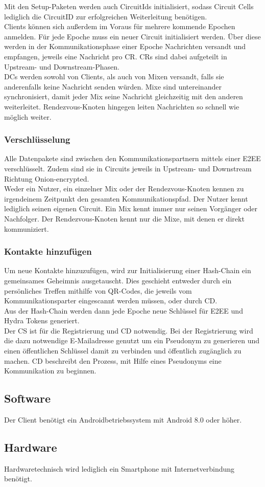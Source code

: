 Mit den Setup-Paketen werden auch CircuitIds initialisiert, sodass Circuit Cells lediglich die CircuitID zur erfolgreichen Weiterleitung benötigen.\\
Clients können sich außerdem im Voraus für mehrere kommende Epochen anmelden.
Für jede Epoche muss ein neuer Circuit initialisiert werden.
Über diese werden in der Kommunikationsphase einer Epoche Nachrichten versandt und empfangen, jeweils eine Nachricht pro \ac{CR}.
\acp{CR} sind dabei aufgeteilt in Upstream- und Downstream-Phasen.\\
\acp{DC} werden sowohl von Clients, als auch von Mixen versandt, falls sie anderenfalls keine Nachricht senden würden.
Mixe sind untereinander synchronisiert, damit jeder Mix seine Nachricht gleichzeitig mit den anderen weiterleitet.
Rendezvous-Knoten hingegen leiten Nachrichten so schnell wie möglich weiter.

\subsubsection{Verschlüsselung}
Alle Datenpakete sind zwischen den Kommunikationspartnern mittels einer \ac{E2EE} verschlüsselt.
Zudem sind sie in Circuits jeweils in Upstream- und Downstream Richtung Onion-encrypted.\\
\newline
Weder ein Nutzer, ein einzelner Mix oder der Rendezvous-Knoten kennen zu irgendeinem Zeitpunkt den gesamten Kommunikationspfad.
Der Nutzer kennt lediglich seinen eigenen Circuit.
Ein Mix kennt immer nur seinen Vorgänger oder Nachfolger.
Der Rendezvous-Knoten kennt nur die Mixe, mit denen er direkt kommuniziert.

\subsubsection{Kontakte hinzufügen}
Um neue Kontakte hinzuzufügen, wird zur Initialisierung einer Hash-Chain ein gemeinsames Geheimnis ausgetauscht.
Dies geschieht entweder durch ein persönliches Treffen mithilfe von QR-Codes, die jeweils vom Kommunikationsparter eingescannt werden müssen, oder durch \ac{CD}.\\
Aus der Hash-Chain werden dann jede Epoche neue Schlüssel für \ac{E2EE} und Hydra Tokens generiert.\\
Der \ac{CS} ist für die Registrierung und \ac{CD} notwendig. Bei der Registrierung wird die dazu notwendige E-Mailadresse genutzt um ein Pseudonym zu generieren und einen öffentlichen Schlüssel damit zu verbinden und öffentlich zugänglich zu machen. \ac{CD} beschreibt den Prozess, mit Hilfe eines Pseudonyms eine Kommunikation zu beginnen.\\


\subsection{Software}
Der Client benötigt ein Androidbetriebssystem mit Android 8.0 oder höher.
	
\subsection{Hardware}
Hardwaretechnisch wird lediglich ein Smartphone mit Internetverbindung benötigt.

